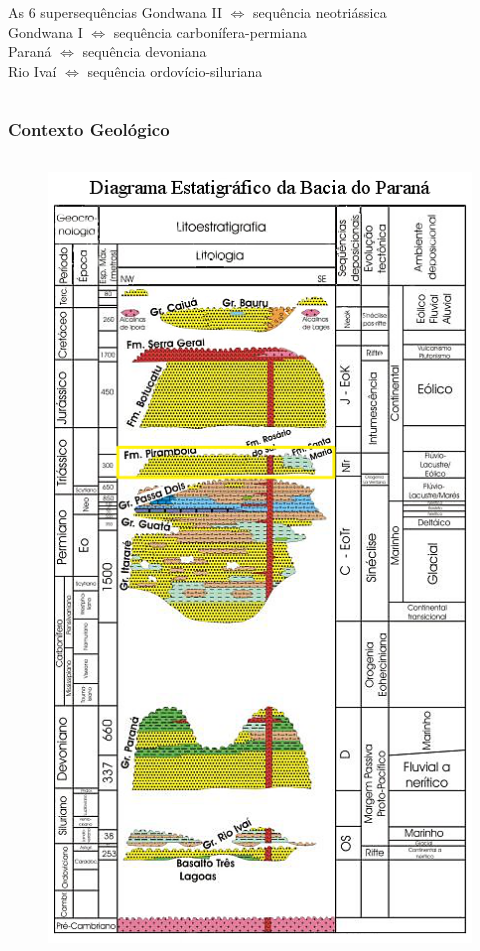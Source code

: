 \documentclass[10pt]{beamer} %
\begin{document}
\begin{frame}
\begin{columns}
\begin{column}{0.75\textwidth}
\begin{block}{As $6$ supersequências}
				Gondwana II $\Longleftrightarrow$ sequência neotriássica \\
				Gondwana I $\Longleftrightarrow$ sequência carbonífera-permiana\\ 
				Paraná $\Longleftrightarrow$ sequência devoniana\\
				Rio Ivaí $\Longleftrightarrow$ sequência ordovício-siluriana\\
				\cite{Vail_1977,assine_1994,milani_orogenias_1998}
			\end{block}
		\end{column}
	\end{columns}
\end{frame}

\begin{frame}
	\frametitle{Contexto Geológico}
	\begin{columns}
		\begin{column}{0.4\textwidth}
			\begin{figure}
				\includegraphics[scale=0.36]{Imagens/diagramagondwanaii.png}

\end{figure}
\end{column}
\end{columns}
\end{frame}
\end{document}
